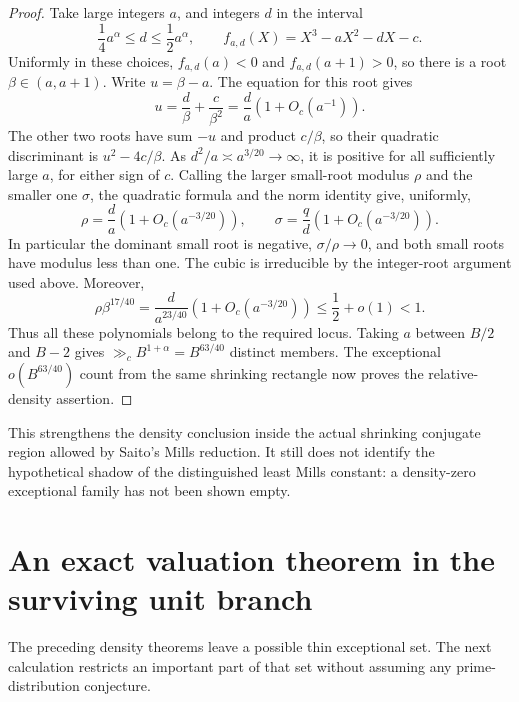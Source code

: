 \documentclass[11pt,a4paper]{article}
\theoremstyle{definition}
\theoremstyle{remark}
\numberwithin{equation}{section}
\begin{document}
\begin{proof}
Take large integers $a$, and integers $d$ in the interval
\[
 \frac14a^\alpha\le d\le\frac12a^\alpha,
 \qquad f_{a,d}(X)=X^3-aX^2-dX-c.
\]
Uniformly in these choices, $f_{a,d}(a)<0$ and
$f_{a,d}(a+1)>0$, so there is a root $\beta\in(a,a+1)$.
Write $u=\beta-a$. The equation for this root gives
\[
 u=\frac d\beta+\frac c{\beta^2}
   =\frac da\left(1+O_c(a^{-1})\right).
\]
The other two roots have sum $-u$ and product $c/\beta$, so their
quadratic discriminant is $u^2-4c/\beta$.
As $d^2/a\asymp a^{3/20}\to\infty$, it is positive for all
sufficiently large $a$, for either sign of $c$. Calling the larger
small-root modulus $\rho$ and the smaller one $\sigma$, the
quadratic formula and the norm identity give, uniformly,
\[
 \rho=\frac da\left(1+O_c(a^{-3/20})\right),\qquad
 \sigma=\frac qd\left(1+O_c(a^{-3/20})\right).
\]
In particular the dominant small root is negative,
$\sigma/\rho\to0$, and both small roots have modulus less than one.
The cubic is irreducible by the integer-root argument used above.
Moreover,
\[
 \rho\beta^{17/40}
 =\frac d{a^{23/40}}\left(1+O_c(a^{-3/20})\right)
 \le\frac12+o(1)<1.
\]
Thus all these polynomials belong to the required locus.
Taking $a$ between $B/2$ and $B-2$ gives
$\gg_c B^{1+\alpha}=B^{63/40}$ distinct members. The exceptional
$o(B^{63/40})$ count from the same shrinking rectangle now proves
the relative-density assertion.
\end{proof}

This strengthens the density conclusion inside the actual shrinking
conjugate region allowed by Saito's Mills reduction. It still does not
identify the hypothetical shadow of the distinguished least Mills
constant: a density-zero exceptional family has not been shown empty.

\section{An exact valuation theorem in the surviving unit branch}
\label{f13:sec:r2-valuations}

The preceding density theorems leave a possible thin exceptional
set. The next calculation restricts an important part of that set
without assuming any prime-distribution conjecture.
\end{document}
